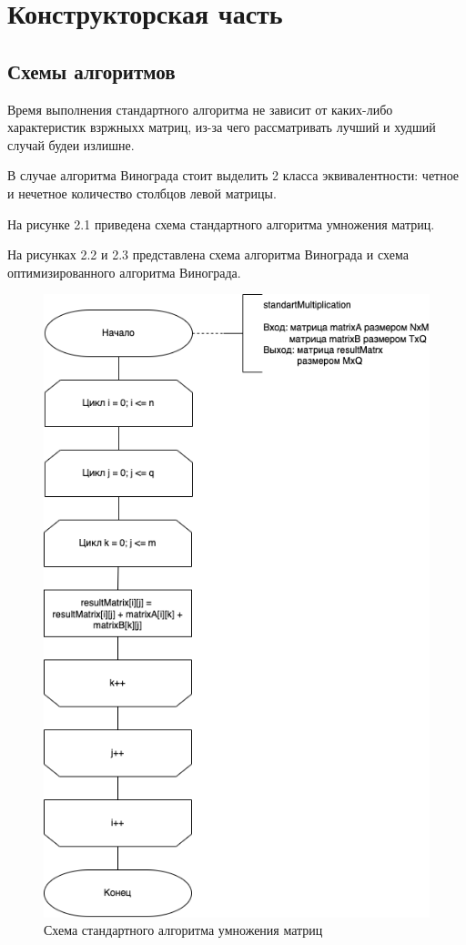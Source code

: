 \chapter{Конструкторская часть}

\section{Схемы алгоритмов}

Время выполнения стандартного алгоритма не зависит от каких-либо характеристик взржныхх матриц, из-за чего рассматривать лучший и худший случай будеи излишне.

В случае алгоритма Винограда стоит выделить 2 класса эквивалентности: четное и нечетное количество столбцов левой матрицы.

На рисунке 2.1 приведена схема стандартного алгоритма умножения матриц.

На рисунках 2.2 и 2.3 представлена схема алгоритма Винограда и схема оптимизированного алгоритма Винограда. 

\begin{figure}[ht!]
	\centering
	\includegraphics[width=0.9\linewidth]{img/Standard.png}
	\caption{Схема стандартного алгоритма умножения матриц}
	\label{fig:mpr}
\end{figure}

